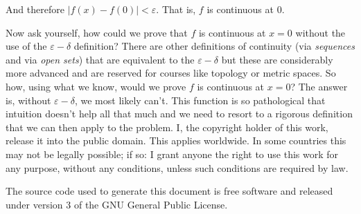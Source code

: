 \documentclass{article}
\theoremstyle{normal}
\begin{document}
    And therefore $|f(x)-f(0)|<\varepsilon$. That is, $f$ is continuous at 0.
    \par\hfill\par
    Now ask yourself, how could we prove that $f$ is continuous at $x=0$
    without the use of the $\varepsilon-\delta$ definition? There are other
    definitions of continuity (via \textit{sequences} and via
    \textit{open sets}) that are equivalent to the $\varepsilon-\delta$ but
    these are considerably more advanced and are reserved for courses like
    topology or metric spaces. So how, using what we know, would we
    prove $f$ is continuous at $x=0$? The answer is, without
    $\varepsilon-\delta$, we most likely can't. This function is so pathological
    that intuition doesn't help all that much and we need to resort to a
    rigorous definition that we can then apply to the problem.
    \newpage
    I, the copyright holder of this work, release it into the public domain.
    This applies worldwide. In some countries this may not be legally possible;
    if so: I grant anyone the right to use this work for any purpose, without
    any conditions, unless such conditions are required by law.
    \par\hfill\par
    The source code used to generate this document is free software and released
    under version 3 of the GNU General Public License.
\end{document}
